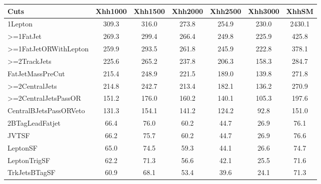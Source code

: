 \begin{table}[!htbp]
\begin{center}
\begin{adjustbox}{max width=\textwidth}
\begin{tabular}{| l | c | c | c | c | c | c |}
Cuts                      &     Xhh1000     &     Xhh1500     &     Xhh2000     &     Xhh2500     &     Xhh3000     &      XhhSM      \\
\hline
1Lepton                   &      309.3      &      316.0      &      273.8      &      254.9      &      230.0      &     2430.1      \\
>=1FatJet                 &      269.3      &      299.4      &      266.4      &      249.8      &      225.9      &      425.8      \\
>=1FatJetORWithLepton     &      259.9      &      293.5      &      261.8      &      245.9      &      222.8      &      378.1      \\
>=2TrackJets              &      225.6      &      265.2      &      237.8      &      206.3      &      158.3      &      284.7      \\
FatJetMassPreCut          &      215.4      &      248.9      &      221.5      &      189.0      &      139.8      &      271.8      \\
>=2CentralJets            &      214.8      &      242.7      &      213.4      &      182.1      &      136.2      &      270.9      \\
>=2CentralJetsPassOR      &      151.2      &      176.0      &      160.2      &      140.1      &      105.3      &      197.6      \\
CentralBJetsPassORVeto    &      131.3      &      154.1      &      141.2      &      124.2      &      92.8       &      151.0      \\
2BTagLeadFatjet           &      66.4       &      76.0       &      60.2       &      44.7       &      26.9       &      76.1       \\
JVTSF                     &      66.2       &      75.7       &      60.2       &      44.7       &      26.9       &      76.6       \\
LeptonSF                  &      65.0       &      74.5       &      59.3       &      44.1       &      26.6       &      74.7       \\
LeptonTrigSF              &      62.2       &      71.3       &      56.6       &      42.1       &      25.5       &      71.6       \\
TrkJetsBTagSF             &      60.9       &      68.1       &      53.4       &      39.6       &      24.1       &      71.3       \\

\end{tabular}
\end{adjustbox}
\end{center}
\end{table}
